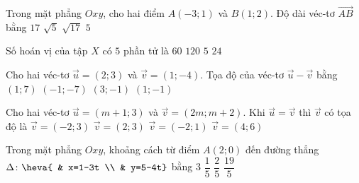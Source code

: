 \begin{ex}%
	Trong mặt phẳng $Oxy$, cho hai điểm $A(-3;1)$ và $B(1;2)$. Độ dài véc-tơ $\overrightarrow{AB}$ bằng 
	\choice
	{$17$}
	{$\sqrt{5}$}
	{\True $\sqrt{17}$}
	{$5$}
\end{ex}
\begin{ex}%
	Số hoán vị của tập $X$ có  $5$  phần tử là 
	\choice
	{$60$}
	{\True $120$}
	{$5$}
	{$24$}
\end{ex}
\begin{ex}%
	Cho hai véc-tơ $\overrightarrow{u}=(2;3)$ và $\overrightarrow{v}=(1;-4)$. Tọa độ của véc-tơ $\overrightarrow{u}-\overrightarrow{v}$ bằng
	\choice
	{\True $(1;7)$}
	{$(-1;-7)$}
	{$(3;-1)$}
	{$(1;-1)$}
\end{ex}
\begin{ex}%
	Cho hai véc-tơ $\overrightarrow{u}=(m+1;3)$ và $\overrightarrow{v}=(2m;m+2)$. Khi $\overrightarrow{u}=\overrightarrow{v}$ thì $\overrightarrow{v}$ có tọa độ là 
	\choice
	{$\overrightarrow{v}=(-2;3)$}
	{\True $\overrightarrow{v}=(2;3)$}
	{$\overrightarrow{v}=(-2;1)$}
	{$\overrightarrow{v}=(4;6)$}
\end{ex}
\begin{ex}%
	Trong mặt phẳng $Oxy$, khoảng cách từ điểm $A(2;0)$ đến đường thẳng $\Delta\colon\heva{
		& x=1-3t \\
		& y=5-4t}$ bằng 
	\choice
	{$3$}
	{$\dfrac{1}{5}$}
	{$\dfrac{2}{5}$}
	{\True $\dfrac{19}{5}$}
\end{ex}
